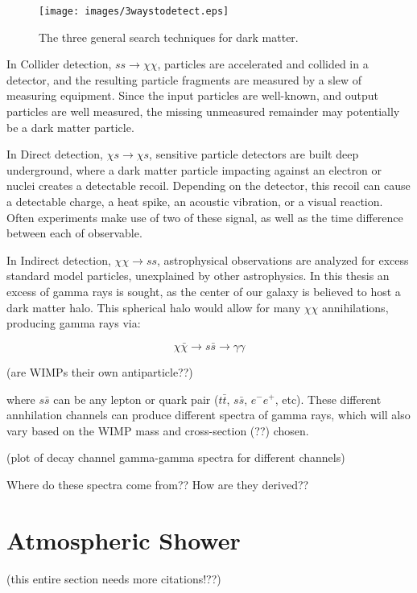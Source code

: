 \begin{figure}[ht]
  \begin{center}
    \texttt{[image: images/3waystodetect.eps]}
    \caption[3 Search Techniques]{The three general search techniques for dark matter.}\label{fig:3_searches}
  \end{center}
\end{figure}

In Collider detection, $ss \rightarrow \chi\chi$, particles are accelerated and collided in a detector, and the resulting particle fragments are measured by a slew of measuring equipment.
Since the input particles are well-known, and output particles are well measured, the missing unmeasured remainder may potentially be a dark matter particle.

In Direct detection, $\chi s \rightarrow \chi s$, sensitive particle detectors are built deep underground, where a dark matter particle impacting against an electron or nuclei creates a detectable recoil.
Depending on the detector, this recoil can cause a detectable charge, a heat spike, an acoustic vibration, or a visual reaction.
Often experiments make use of two of these signal, as well as the time difference between each of observable.

In Indirect detection, $\chi\chi \rightarrow ss$, astrophysical observations are analyzed for excess standard model particles, unexplained by other astrophysics.
In this thesis an excess of gamma rays is sought, as the center of our galaxy is believed to host a dark matter halo.
This spherical halo would allow for many $\chi\chi$ annihilations, producing gamma rays via: 

$$\chi\bar{\chi} \rightarrow s\bar{s} \rightarrow \gamma\gamma$$

(are WIMPs their own antiparticle??)

where $s\bar{s}$ can be any lepton or quark pair ($t\bar{t}$, $s\bar{s}$, $e^{-}e^{+}$, etc).
These different annhilation channels can produce different spectra of gamma rays, which will also vary based on the WIMP mass and cross-section (??) chosen.

(plot of decay channel gamma-gamma spectra for different channels)

Where do these spectra come from??
How are they derived??


\section{Atmospheric Shower}
(this entire section needs more citations!??)


